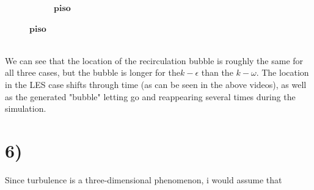 \documentclass[a4paper,english,12pt,twoside]{article}
\begin{document}
\begin{figure}[h!]
\begin{subfigure}{0.3\linewidth}
		\caption{$\mathbf{piso}$}
	\end{subfigure}
\end{figure}\\
We can see that the location of the recirculation bubble is roughly the same for all three cases, but the bubble is longer for the$k-\epsilon$ than the $k-\omega$. The location in the LES case shifts through time (as can be seen in the above videos), as well as the generated "bubble" letting go and reappearing several times during the simulation. 
\section*{6)}
Since turbulence is a three-dimensional phenomenon, i would assume that 
 
\end{document}
